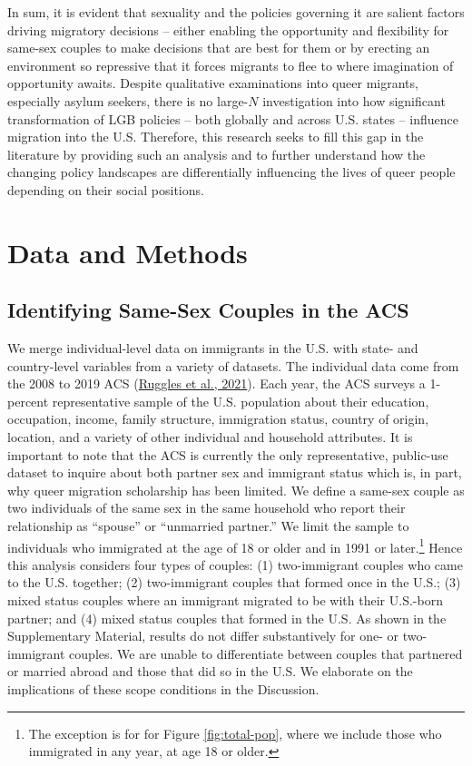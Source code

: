 \documentclass[
  12pt,
]{article}
\begin{document}
In sum, it is evident that sexuality and the policies governing it are salient factors driving migratory decisions -- either enabling the opportunity and flexibility for same-sex couples to make decisions that are best for them or by erecting an environment so repressive that it forces migrants to flee to where imagination of opportunity awaits. Despite qualitative examinations into queer migrants, especially asylum seekers, there is no large-\(N\) investigation into how significant transformation of LGB policies -- both globally and across U.S. states -- influence migration into the U.S. Therefore, this research seeks to fill this gap in the literature by providing such an analysis and to further understand how the changing policy landscapes are differentially influencing the lives of queer people depending on their social positions.

\hypertarget{data-and-methods}{%
\section{Data and Methods}\label{data-and-methods}}

\hypertarget{identifying-same-sex-couples-in-the-acs}{%
\subsection{Identifying Same-Sex Couples in the ACS}\label{identifying-same-sex-couples-in-the-acs}}

We merge individual-level data on immigrants in the U.S. with state- and country-level variables from a variety of datasets. The individual data come from the 2008 to 2019 ACS (\protect\hyperlink{ref-ruggles_2021}{Ruggles et al., 2021}). Each year, the ACS surveys a 1-percent representative sample of the U.S. population about their education, occupation, income, family structure, immigration status, country of origin, location, and a variety of other individual and household attributes. It is important to note that the ACS is currently the only representative, public-use dataset to inquire about both partner sex and immigrant status which is, in part, why queer migration scholarship has been limited. We define a same-sex couple as two individuals of the same sex in the same household who report their relationship as ``spouse'' or ``unmarried partner.'' We limit the sample to individuals who immigrated at the age of 18 or older and in 1991 or later.\footnote{The exception is for for Figure \ref{fig:total-pop}, where we include those who immigrated in any year, at age 18 or older.} Hence this analysis considers four types of couples: (1) two-immigrant couples who came to the U.S. together; (2) two-immigrant couples that formed once in the U.S.; (3) mixed status couples where an immigrant migrated to be with their U.S.-born partner; and (4) mixed status couples that formed in the U.S. As shown in the Supplementary Material, results do not differ substantively for one- or two-immigrant couples. We are unable to differentiate between couples that partnered or married abroad and those that did so in the U.S. We elaborate on the implications of these scope conditions in the Discussion.
\end{document}
